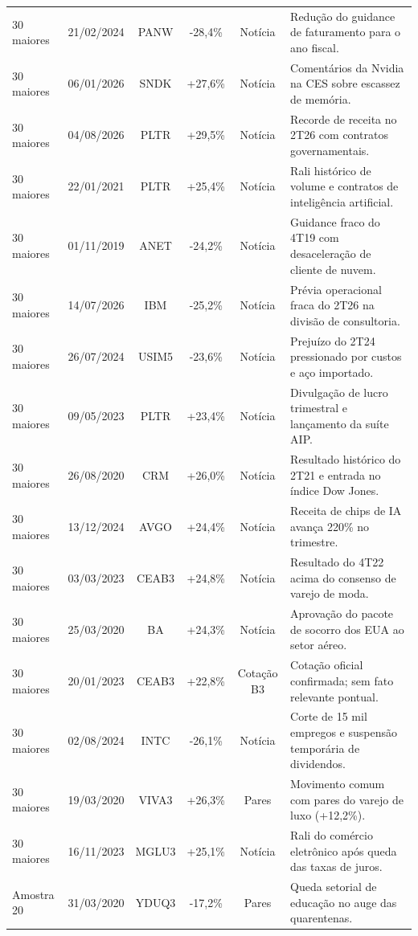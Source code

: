 \documentclass[11pt,a4paper]{article}
\begin{document}
\begin{longtable}{l c c c c p{}}
30 maiores & 21/02/2024 & PANW & -28,4\% & Notícia & Redução do guidance de faturamento para o ano fiscal. \\
30 maiores & 06/01/2026 & SNDK & +27,6\% & Notícia & Comentários da Nvidia na CES sobre escassez de memória. \\
30 maiores & 04/08/2026 & PLTR & +29,5\% & Notícia & Recorde de receita no 2T26 com contratos governamentais. \\
30 maiores & 22/01/2021 & PLTR & +25,4\% & Notícia & Rali histórico de volume e contratos de inteligência artificial. \\
30 maiores & 01/11/2019 & ANET & -24,2\% & Notícia & Guidance fraco do 4T19 com desaceleração de cliente de nuvem. \\
30 maiores & 14/07/2026 & IBM & -25,2\% & Notícia & Prévia operacional fraca do 2T26 na divisão de consultoria. \\
30 maiores & 26/07/2024 & USIM5 & -23,6\% & Notícia & Prejuízo do 2T24 pressionado por custos e aço importado. \\
30 maiores & 09/05/2023 & PLTR & +23,4\% & Notícia & Divulgação de lucro trimestral e lançamento da suíte AIP. \\
30 maiores & 26/08/2020 & CRM & +26,0\% & Notícia & Resultado histórico do 2T21 e entrada no índice Dow Jones. \\
30 maiores & 13/12/2024 & AVGO & +24,4\% & Notícia & Receita de chips de IA avança 220\% no trimestre. \\
30 maiores & 03/03/2023 & CEAB3 & +24,8\% & Notícia & Resultado do 4T22 acima do consenso de varejo de moda. \\
30 maiores & 25/03/2020 & BA & +24,3\% & Notícia & Aprovação do pacote de socorro dos EUA ao setor aéreo. \\
30 maiores & 20/01/2023 & CEAB3 & +22,8\% & Cotação B3 & Cotação oficial confirmada; sem fato relevante pontual. \\
30 maiores & 02/08/2024 & INTC & -26,1\% & Notícia & Corte de 15 mil empregos e suspensão temporária de dividendos. \\
30 maiores & 19/03/2020 & VIVA3 & +26,3\% & Pares & Movimento comum com pares do varejo de luxo (+12,2\%). \\
30 maiores & 16/11/2023 & MGLU3 & +25,1\% & Notícia & Rali do comércio eletrônico após queda das taxas de juros. \\
Amostra 20 & 31/03/2020 & YDUQ3 & -17,2\% & Pares & Queda setorial de educação no auge das quarentenas. \\

\end{longtable}
\end{document}
